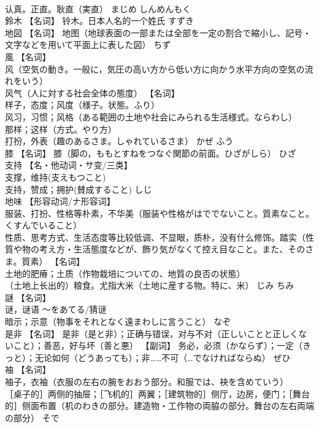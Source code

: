\documentclass[8pt]{extreport}
\begin{document}
\begin{CJK}{UTF8}{min}
\\	认真。正直。耿直（実直）	まじめ しんめんもく	
\\	鈴木	【名词】 铃木。日本人名的一个姓氏	すずき	
\\	地図	【名词】 地图（地球表面の一部または全部を一定の割合で縮小し、記号・文字などを用いて平面上に表した図）	ちず	
\\	風	【名词】 
\\	风（空気の動き。一般に，気圧の高い方から低い方に向かう水平方向の空気の流れをいう） 
\\	风气（人に対する社会全体の態度） 【名词】 
\\	样子，态度；风度（様子。状態。ふり） 
\\	风习，习惯；风格（ある範囲の土地や社会にみられる生活様式。ならわし） 
\\	那样；这样（方式。やり方） 
\\	打扮，外表（趣のあるさま。しゃれているさま）	かぜ ふう	
\\	膝	【名词】 膝（脚の，ももとすねをつなぐ関節の前面。ひざがしら）	ひざ	
\\	支持	【名・他动词・サ变/三类】 
\\	支撑，维持(支えもつこと) 
\\	支持，赞成；拥护(賛成すること)	しじ	
\\	地味	【形容动词/ナ形容词】 
\\	服装、打扮、性格等朴素，不华美（服装や性格がはででないこと。質素なこと。くすんでいること） 
\\	性质、思考方式、生活态度等比较低调、不显眼，质朴，没有什么修饰。踏实（性質や物の考え方・生活態度などが、飾り気がなくて控え目なこと。また、そのさま。質素） 【名词】 
\\	土地的肥瘠；土质（作物栽培についての、地質の良否の状態） 
\\	（土地上长出的）粮食。尤指大米（土地に産する物。特に、米）	じみ ちみ	
\\	謎	【名词】 
\\	谜，谜语 ～をあてる/猜谜 
\\	暗示；示意（物事をそれとなく遠まわしに言うこと）	なぞ	
\\	是非	【名词】 是非（是と非）；正确与错误，对与不对（正しいことと正しくないこと）；善恶，好与坏（善と悪） 【副词】 务必，必须（かならず）；一定（きっと）；无论如何（どうあっても）；非……不可（…でなければならぬ）	ぜひ	
\\	袖	【名词】 
\\	袖子，衣袖（衣服の左右の腕をおおう部分。和服では、袂を含めていう） 
\\	［桌子的］两侧的抽屉；［飞机的］两翼；［建筑物的］侧厅，边房，便门；［舞台的］侧面布置（机のわきの部分。建造物・工作物の両脇の部分。舞台の左右両端の部分）	そで	

\end{CJK}
\end{document}
